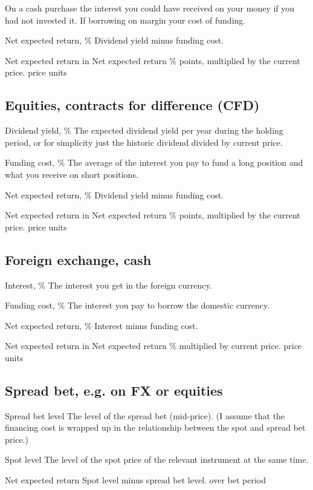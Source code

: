 On a cash purchase the interest you could have received on your money if you had not invested it. If borrowing on margin your cost of funding.

Net expected return, \% Dividend yield minus funding cost.

Net expected return in Net expected return \% points, multiplied by the current price. price units

\subsection*{Equities, contracts for difference (CFD)}

Dividend yield, \% The expected dividend yield per year during the holding period, or for simplicity just the historic dividend divided by current price.

Funding cost, \% The average of the interest you pay to fund a long position and what you receive on short positions.

Net expected return, \% Dividend yield minus funding cost.

Net expected return in Net expected return \% points, multiplied by the current price. price units

\subsection*{Foreign exchange, cash}

Interest, \% The interest you get in the foreign currency.

Funding cost, \% The interest you pay to borrow the domestic currency.

Net expected return, \% Interest minus funding cost.

Net expected return in Net expected return \% multiplied by current price. price units

\subsection*{Spread bet, e.g. on FX or equities}

Spread bet level The level of the spread bet (mid-price). (I assume that the financing cost is wrapped up in the relationship between the spot and spread bet price.)

Spot level The level of the spot price of the relevant instrument at the same time.

Net expected return Spot level minus spread bet level. over bet period

